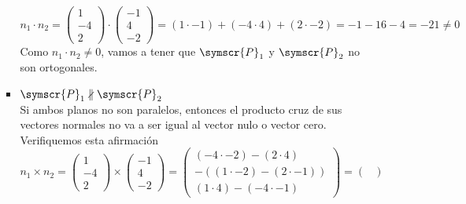 \documentclass{article}
\def\fancyP{\symscr{P}}
\begin{document}
\begin{enumerate}
\begin{itemize}
\begin{itemize}
                    \[
                        n_1 \cdot n_2 
                        =
                        \begin{pmatrix}
                            1 \\ -4 \\ 2
                        \end{pmatrix}
                        \cdot
                        \begin{pmatrix}
                            -1 \\ 4 \\ -2
                        \end{pmatrix}
                        =
                        (1 \cdot -1) + (-4 \cdot 4) + (2 \cdot -2)
                        =
                        -1 - 16 - 4
                        =
                        -21
                        \neq
                        0
                    \]
                    Como \(n_1 \cdot n_2 \neq 0\), vamos a tener que \(\fancyP_1\) y \(\fancyP_2\) no son ortogonales.
                \item \(\fancyP_1 \nparallel \fancyP_2\) \\
                    Si ambos planos no son paralelos, entonces el producto cruz de sus vectores normales no va a ser igual al vector nulo o vector cero. Verifiquemos esta afirmación
                    \[
                        n_1 \times n_2 
                        =
                        \begin{pmatrix}
                            1 \\ -4 \\ 2
                        \end{pmatrix}
                        \times
                        \begin{pmatrix}
                            -1 \\ 4 \\ -2
                        \end{pmatrix}
                        =
                        \begin{pmatrix}
                            (-4 \cdot -2) - (2 \cdot 4) \\
                            -( (1 \cdot -2) - (2 \cdot -1) ) \\
                            (1 \cdot 4) - (-4 \cdot -1)
                        \end{pmatrix}
                        =
                        \begin{pmatrix}

\end{pmatrix}\]
\end{itemize}
\end{itemize}
\end{enumerate}
\end{document}
